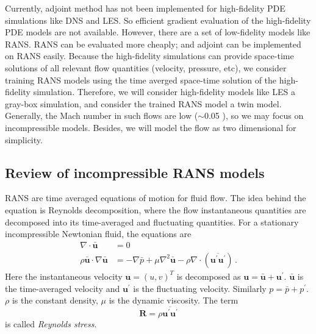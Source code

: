 \documentclass[a4paper,onecolumn]{article}
\theoremstyle{remark}
\begin{document}
\noindent Currently, adjoint method has not been implemented for high-fidelity PDE simulations
like DNS and LES. So efficient gradient evaluation of the high-fidelity PDE models 
are not available.
However, there are a set of low-fidelity models like RANS. 
RANS can be evaluated more cheaply; and adjoint can be implemented on RANS easily.
Because the high-fidelity simulations can provide
space-time solutions of all relevant flow quantities (velocity, pressure, etc), we consider
training RANS models using the time averged space-time solution of the high-fidelity simulation.
Therefore, we will consider high-fidelity models like LES a gray-box simulation,
and consider the trained RANS model a twin model.
Generally, the Mach number in such flows are low ($\sim$0.05 \cite{ubend rans opt 1}),
so we may focus on incompressible models. Besides, we will model the flow as two dimensional
for simplicity.
\\

\subsection{Review of incompressible RANS models}
\noindent RANS are time averaged equations of motion for fluid flow.
The idea behind the equation is Reynolds decomposition, where the flow instantaneous
quantities are decomposed into its time-averaged and fluctuating quantities.
For a stationary incompressible Newtonian fluid, the equations are
\begin{equation}\begin{split}
    \nabla\cdot \bar{\mathbf{u}} &= 0\\
    \rho \bar{\mathbf{u}}\cdot \nabla \bar{\mathbf{u}} &= -\nabla \bar{p} + \mu \nabla^2
    \bar{\mathbf{u}}
    -{\rho} \nabla \cdot\left(\overline{\mathbf{u}^\prime \mathbf{u}^\prime}\right)\,.
\end{split}\end{equation}
Here the instantaneous velocity $\mathbf{u} = (u,v)^T$ is decomposed as 
$\mathbf{u} = \bar{\mathbf{u}} + \mathbf{u}^\prime$. $\bar{\mathbf{u}}$ is the 
time-averaged velocity and $\mathbf{u}^\prime$ is the fluctuating velocity.
Similarly $p = \bar{p} + p^\prime$.
$\rho$ is the constant density, $\mu$ is the dynamic viscosity.
The term
\begin{equation}
    \mathbf{R} = \rho \overline{\mathbf{u}^\prime \mathbf{u}^\prime}
\end{equation}
is called \emph{Reynolds stress}.\\
\end{document}
